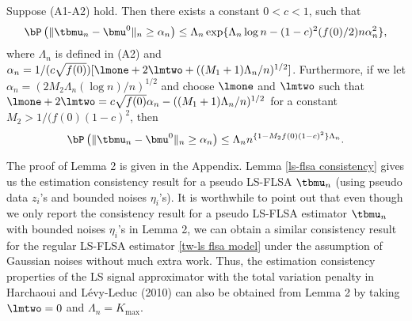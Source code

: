 \documentclass[12pt]{article}
\begin{document}
 \begin{lemma} \label{ls-flsa consistency}
Suppose (A1-A2) hold.   %
Then there exists a constant $0<c<1$,   such that
 $$\bP\left(\|\tbmu_n-\bmu^0\|_n \ge \alpha_n \right) \le  \Lambda_n \exp\{ \Lambda_n\log n -(1-c)^2(f(0)/2) n\alpha_n^2\},$$
 where
 $\Lambda_n$ is defined in (A2) and
 $\alpha_n=1/(c\sqrt{f(0)}) [\lmone+2\lmtwo
     +((M_1+1)\Lambda_n/n)^{1/2}]$.
 Furthermore, if we let $\alpha_n=(2M_2 \Lambda_n (\log n)/n)^{1/2}$ and
choose $\lmone$ and $\lmtwo$ such that
$\lmone+2\lmtwo=c\sqrt{f(0)}\alpha_n-((M_1+1)\Lambda_n/n)^{1/2}$
 for a constant $M_2>1/(f(0)(1-c)^{2}$, then
 $$ \bP\left(\|\tbmu_n-\bmu^0\|_n \ge \alpha_n\right)
\le \Lambda_n n^{\{1-M_2f(0)(1-c)^2\}\Lambda_n}.$$
  \end{lemma}
The proof of Lemma 2 is given in the Appendix.
 Lemma \ref{ls-flsa consistency} gives  us the estimation consistency result for
a pseudo LS-FLSA  $\tbmu_n$ (using  pseudo data $z_i$'s
and bounded noises $\eta_i$'s).
It is worthwhile to point out that even though we only report the consistency result for
 a pseudo LS-FLSA estimator $\tbmu_n$ with %
  bounded noises $\eta_i$'s  in Lemma 2,
we can obtain a similar consistency result for the regular LS-FLSA
 estimator \eqref{tw-ls flsa model} under the assumption of Gaussian noises without much extra work.
Thus, the estimation consistency properties
 of the LS signal approximator with  the total variation penalty
in Harchaoui and L\'{e}vy-Leduc (2010)
can also be obtained from Lemma 2 by taking $\lmtwo=0$  and $\Lambda_n=K_{\max}$.
\end{document}
